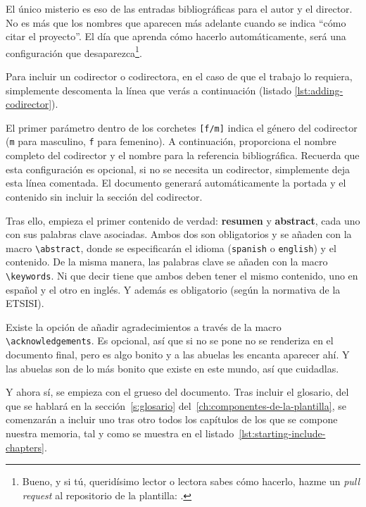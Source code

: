 El único misterio es eso de las entradas bibliográficas para el autor y el director. No es más que los nombres que aparecen más adelante cuando se indica \enquote{cómo citar el proyecto}. El día que aprenda cómo hacerlo automáticamente, será una configuración que desaparezca\footnote{Bueno, y si tú, queridísimo lector o lectora sabes cómo hacerlo, hazme un \textit{pull request} al repositorio de la plantilla: \href{\templaterepository}{\templaterepository}.}.

Para incluir un codirector o codirectora, en el caso de que el trabajo lo requiera, simplemente descomenta la línea que verás a continuación (listado \ref{lst:adding-codirector}).



El primer parámetro dentro de los corchetes \texttt{[f/m]} indica el género del codirector (\texttt{m} para masculino, \texttt{f} para femenino). A continuación, proporciona el nombre completo del codirector y el nombre para la referencia bibliográfica. Recuerda que esta configuración es opcional, si no se necesita un codirector, simplemente deja esta línea comentada. El documento generará automáticamente la portada y el contenido sin incluir la sección del codirector.


Tras ello, empieza el primer contenido de verdad: \textbf{resumen} y \textbf{abstract}, cada uno con sus palabras clave asociadas. Ambos dos son obligatorios y se añaden con la macro \lstinline{\abstract}, donde se especificarán el idioma (\texttt{spanish} o \texttt{english}) y el contenido. De la misma manera, las palabras clave se añaden con la macro \lstinline{\keywords}. Ni que decir tiene que ambos deben tener el mismo contenido, uno en español y el otro en inglés. Y además es obligatorio (según la normativa de la ETSISI).

Existe la opción de añadir agradecimientos a través de la macro \lstinline{\acknowledgements}. Es opcional, así que si no se pone no se renderiza en el documento final, pero es algo bonito y a las abuelas les encanta aparecer ahí. Y las abuelas son de lo más bonito que existe en este mundo, así que cuidadlas.

Y ahora sí, se empieza con el grueso del documento. Tras incluir el glosario, del que se hablará en la sección~\ref{s:glosario} del~\ref{ch:componentes-de-la-plantilla}, se comenzarán a incluir uno tras otro todos los capítulos de los que se compone nuestra memoria, tal y como se muestra en el listado~\ref{lst:starting-include-chapters}.

